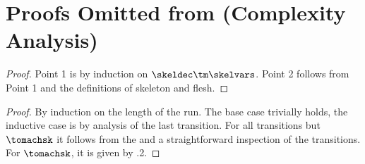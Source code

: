 
\section{Proofs Omitted from  (Complexity Analysis)}
\label{sect:app-complexity}


\begin{proof}
Point 1 is by induction on $\skeldec\tm\skelvars$. Point 2 follows from Point 1 and the definitions of skeleton and flesh.
\end{proof}





\begin{proof}
By induction on the length of the run. The base case trivially holds, the inductive case is by analysis of the last transition. For all transitions but $\tomachsk$ it follows from the \ih and a straightforward inspection of the transitions. For $\tomachsk$, it is given by .2.
\end{proof}


